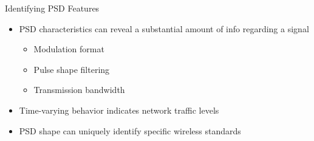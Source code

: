 \documentclass[10pt]{beamer}
\begin{document}
\begin{frame}[fragile]{Identifying PSD Features}

    \begin{itemize}
        \item PSD characteristics can reveal a substantial amount of info regarding a signal
        \begin{itemize}
            \item Modulation format
            \item Pulse shape filtering
            \item Transmission bandwidth
        \end{itemize}
        \item Time-varying behavior indicates network traffic levels
        \item PSD shape can uniquely identify specific wireless standards
    \end{itemize}

\end{frame}
\end{document}
